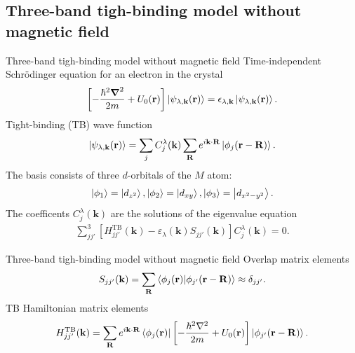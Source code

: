 \documentclass[aspectratio=169,compress,x11names]{beamer}
\begin{document}
	\subsection{Three-band tigh-binding model without magnetic field}
	\begin{frame}{Three-band tigh-binding model without magnetic field}
		Time-independent Schr\"{o}dinger equation for an electron in the crystal
		\begin{gather}
			\left[-\frac{\hbar^{2} \boldsymbol{\nabla}^{2}}{2m} + U_{0}(\mathbf{r})\right] \ket{\psi_{\lambda,\mathbf{k}}(\mathbf{r})} = \epsilon_{\lambda,\mathbf{k}} \ket{\psi_{\lambda,\mathbf{k}}(\mathbf{r})}.
		\end{gather}
		Tight-binding (TB) wave function
		\begin{gather}
			\ket{\psi_{\lambda,\mathbf{k}}(\mathbf{r})} = \sum_{j} C_{j}^{\lambda}(\mathbf{k}) \sum_{\mathbf{R}} e^{i \mathbf{k} \cdot \mathbf{R}} \ket{\phi_{j} (\mathbf{r} - \mathbf{R})}.
		\end{gather}
		The basis consists of three $d$-orbitals of the $M$ atom:
		\begin{gather}
			\ket{\phi_{1}} = \ket{d_{z^{2}}} , 
			\ket{\phi_{2}} = \ket{d_{xy}} , 
			\ket{\phi_{3}} = \ket{d_{x^{2} - y^{2}}}.
		\end{gather}
		The coefficents $C_{j}^{\lambda}(\mathbf{k})$ are the solutions of the eigenvalue equation
		\begin{gather}
			\sum_{jj'}^{3} \left[H_{jj'}^{\text{TB}}(\mathbf{k}) - \varepsilon_{\lambda}(\mathbf{k}) S_{jj'}(\mathbf{k})\right] C_{j}^{\lambda}(\mathbf{k}) = 0.
		\end{gather}
	\end{frame}
	\begin{frame}{Three-band tigh-binding model without magnetic field}
		Overlap matrix elements
		\begin{gather}
			S_{jj'}(\mathbf{k}) = \sum_{\mathbf{R}} \bra{\phi_{j}(\mathbf{r})} \ket{\phi_{j'}(\mathbf{r - R})} \approx \delta_{jj'}.
		\end{gather}
		TB Hamiltonian matrix elements
		\begin{gather}
			H_{jj'}^{\text{TB}}(\mathbf{k}) = \sum_{\mathbf{R}} e^{i \mathbf{k \cdot R}} \bra{\phi_{j}(\mathbf{r})} \left[-\frac{\hbar^{2} \nabla^{2}}{2m} + U_{0}(\mathbf{r})\right] \ket{\phi_{j'}(\mathbf{r - R})}.
		\end{gather}
	\end{frame}
\end{document}
